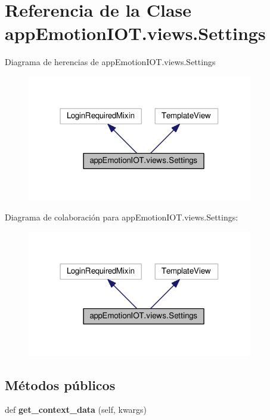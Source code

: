 \hypertarget{classappEmotionIOT_1_1views_1_1Settings}{}\section{Referencia de la Clase app\+Emotion\+I\+O\+T.\+views.\+Settings}
\label{classappEmotionIOT_1_1views_1_1Settings}


Diagrama de herencias de app\+Emotion\+I\+O\+T.\+views.\+Settings
\nopagebreak
\begin{figure}[H]
\begin{center}
\leavevmode
\includegraphics[width=279pt]{classappEmotionIOT_1_1views_1_1Settings__inherit__graph}
\end{center}
\end{figure}


Diagrama de colaboración para app\+Emotion\+I\+O\+T.\+views.\+Settings\+:
\nopagebreak
\begin{figure}[H]
\begin{center}
\leavevmode
\includegraphics[width=279pt]{classappEmotionIOT_1_1views_1_1Settings__coll__graph}
\end{center}
\end{figure}
\subsection*{Métodos públicos}
\begin{DoxyCompactItemize}
\item 
def {\bfseries get\+\_\+context\+\_\+data} (self, kwargs)\hypertarget{classappEmotionIOT_1_1views_1_1Settings_a1791e35b1e22002ebfee54587b2f4ece}{}\label{classappEmotionIOT_1_1views_1_1Settings_a1791e35b1e22002ebfee54587b2f4ece}

\end{DoxyCompactItemize}

